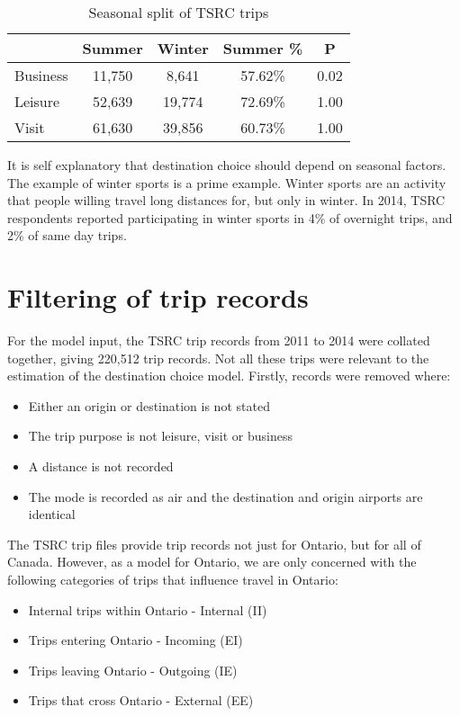 \begin{table}[H]
\centering
\caption{Seasonal split of TSRC trips}
\label{table:season-split}
\begin{tabular}{p{4.07em}cccc}
\toprule
\multicolumn{1}{r}{} & \multicolumn{1}{p{5em}}{Summer} & \multicolumn{1}{p{4.645em}}{Winter} & \multicolumn{1}{p{3.93em}}{Summer \%} & P  \\ \midrule
Business & 11,750 & 8,641  & 57.62\% & 0.02 \\
Leisure & 52,639 & 19,774 & 72.69\% & 1.00 \\
Visit & 61,630 & 39,856 & 60.73\% & 1.00 \\ \bottomrule
\end{tabular}%

\end{table}


It is self explanatory that destination choice should depend on seasonal factors. The example of winter sports is a prime example. Winter sports are an activity that people willing travel long distances for, but only in winter. In 2014, TSRC respondents reported participating in winter sports in 4\% of overnight trips, and 2\% of same day trips.  

\section{Filtering of trip records}
For the model input, the TSRC trip records from 2011 to 2014 were collated together, giving 220,512 trip records. Not all these trips were relevant to the estimation of the destination choice model. Firstly, records were removed where:
\begin{itemize}
\item Either an origin or destination is not stated
\item The trip purpose is not leisure, visit or business
\item A distance is not recorded
\item The mode is recorded as air and the destination and origin airports are identical
\end{itemize}

The TSRC trip files provide trip records not just for Ontario, but for all of Canada. However, as a model for Ontario, we are only concerned with the following categories of trips that influence travel in Ontario:
\begin{itemize}
\item Internal trips within Ontario - Internal (II)
\item Trips entering Ontario - Incoming (EI)
\item Trips leaving Ontario - Outgoing (IE)
\item Trips that cross Ontario - External (EE)
\end{itemize}

